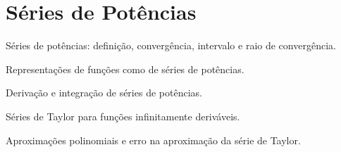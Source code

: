\chapter{Séries de Potências}

Séries de potências: definição, convergência, intervalo e raio de convergência.

Representações de funções como de séries de potências.

Derivação e integração de séries de potências.

Séries de Taylor para funções infinitamente deriváveis.

Aproximações polinomiais e erro na aproximação da série de Taylor.

